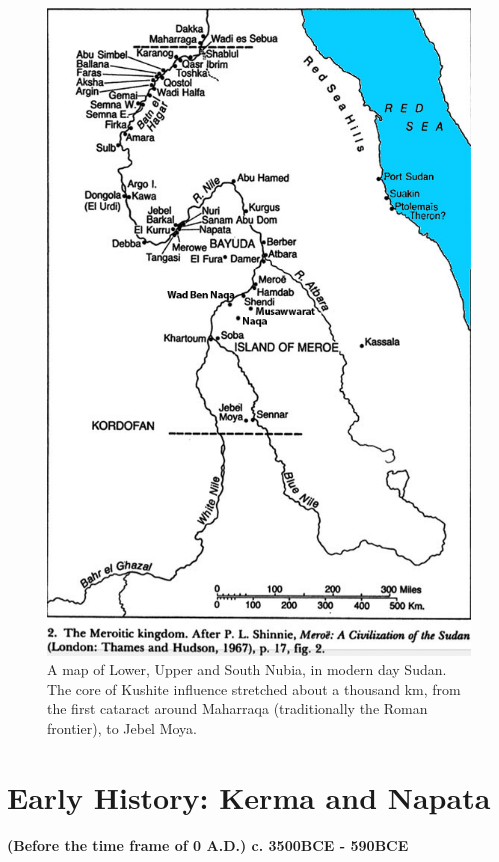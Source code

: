 \documentclass[a4paper,12pt]{scrreprt}
\begin{document}
\begin{figure}[H]
	\centering
	\includegraphics[width=\textwidth]{img/map_of_kush}
	\caption{A map of Lower, Upper and South Nubia, in modern day Sudan. The core of Kushite influence stretched about a thousand km, from the first cataract around Maharraqa (traditionally the Roman frontier), to Jebel Moya.}
\end{figure}

\section{Early History: Kerma and Napata}

\textbf{(Before the time frame of 0 A.D.) c. 3500BCE - 590BCE}\\
\end{document}
